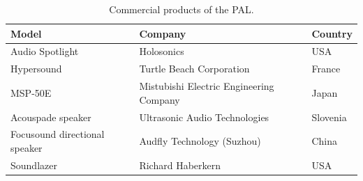 \begin{table}[H]
    \centering
    \begin{tabular}{lll}
        \toprule
        Model & Company & Country\\
        \midrule
        Audio Spotlight & Holosonics & USA \\
        Hypersound & Turtle Beach Corporation& France\\
        MSP-50E & Mistubishi Electric Engineering Company & Japan\\
        Acouspade speaker &  Ultrasonic Audio Technologies& Slovenia\\
        Focusound directional speaker & Audfly Technology (Suzhou) & China \\
        Soundlazer & Richard Haberkern & USA\\
        \bottomrule
    \end{tabular}
    \caption{Commercial products of the PAL.}
    \label{tab:pal_commercial_product}
\end{table}

